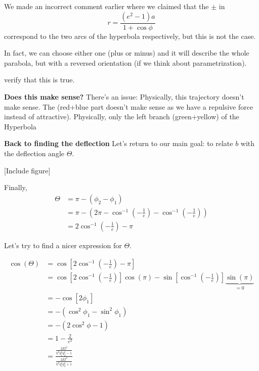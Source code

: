 \documentclass[11pt]{article}
\begin{document}
\begin{redbox}
  We made an incorrect comment earlier where we claimed that the $\pm$ in 
  \[ r = \frac{(e^2 - 1)a}{1 + \cos\phi} \] 
  correspond to the two arcs of the hyperbola respectively, but this is not the case.

  \vskip 0.5cm
  In fact, we can choose either one (plus or minus) and it will describe the whole parabola, but with a reversed orientation (if we think about parametrization).
  \begin{note}
    {verify that this is true.}
  \end{note}
\end{redbox}

\vskip 0.5cm

\textbf{Does this make sense?}
There's an issue: Physically, this trajectory doesn't make sense. The (red+blue part doesn't make sense as we have a repulsive force instead of attractive). Physically, only the left branch (green+yellow) of the Hyperbola 

\vskip 0.5cm
\textbf{Back to finding the deflection}
\vskip 0.5cm
Let's return to our main goal: to relate $b$ with the deflection angle $\Theta$.

\vskip 0.5cm
[Include figure]
\vskip 0.5cm

Finally,
\begin{align*}
  \Theta &= \pi - \left(\phi_2 - \phi_1\right) \\
  &= \pi - \left( 2\pi - \cos^{-1}\left(-\frac{1}{e}\right) - \cos^{-1}\left(-\frac{1}{e}\right) \right) \\
  &= 2\cos^{-1}\left(-\frac{1}{e}\right) - \pi
\end{align*}

Let's try to find a nicer expression for $\Theta$.

\begin{align*}
  \cos(\Theta) &= \cos \left[ 2 \cos^{-1}\left(-\frac{1}{e}\right) - \pi \right] \\
  &= \cos\left[ 2 \cos^{-1}\left(-\frac{1}{e}\right)   \right] \cos(\pi) - \sin \left[\cos^{-1}\left(-\frac{1}{e}\right) \right]\underbrace{\sin(\pi)}_{=0} \\
  &= -\cos\left[2\phi_1\right] \\
  &= -\left(\cos^2\phi_1 - \sin^2\phi_1\right) \\
  &= -\left(2\cos^2\phi - 1\right) \\
  &= 1 - \frac{2}{e^2} \\
  &= \frac{\frac{2E l^2}{k^2 q_1^2 q_2^2 - 1}}{\frac{2E l^2}{k^2 q_1^2 q_2^2 + 1}}
\end{align*}
\end{document}
